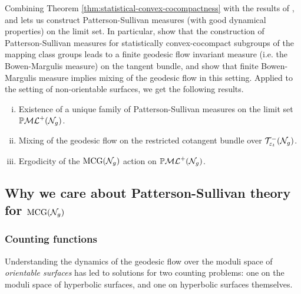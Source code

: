 Combining Theorem \ref{thm:statistical-convex-cocompactness} with the results of \textcite{gekhtman2023dynamics}, and \textcite{CGTY} lets us construct Patterson-Sullivan measures (with good dynamical properties) on the limit set.
In particular, \textcite{CGTY} show that the construction of Patterson-Sullivan measures for statistically convex-cocompact subgroups of the mapping class groups leads to a finite geodesic flow invariant measure (i.e. the Bowen-Margulis measure) on the tangent bundle, and \textcite{gekhtman2023dynamics} show that finite Bowen-Margulis measure implies mixing of the geodesic flow in this setting.
Applied to the setting of non-orientable surfaces, we get the following results.
\begin{enumerate}[(i)]
\item Existence of a unique family of Patterson-Sullivan measures on the limit set $\mathbb{P}\mathcal{ML}^+(\mathcal{N}_g)$.
\item Mixing of the geodesic flow on the restricted cotangent bundle over $\mathcal{T}_{\varepsilon_t}^{-}(\mathcal{N}_g)$.
\item Ergodicity of the $\mathrm{MCG}(\mathcal{N}_g)$ action on $\mathbb{P}\mathcal{ML}^+(\mathcal{N}_g)$.
\end{enumerate}


\subsection*{Why we care about Patterson-Sullivan theory for $\mathrm{MCG}(\mathcal{N}_g)$}

\subsubsection*{Counting functions}

Understanding the dynamics of the geodesic flow over the moduli space of \emph{orientable surfaces} has led to solutions for two counting problems: one on the moduli space of hyperbolic surfaces, and one on hyperbolic surfaces themselves.

